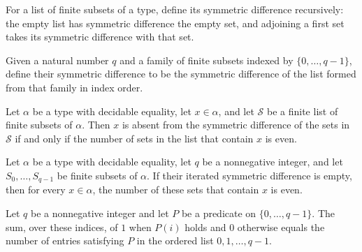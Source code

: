 \begin{definition}
\label{FABL.listSymmDiff}
\leanok
For a list of finite subsets of a type, define its symmetric difference recursively: the
empty list has symmetric difference the empty set, and adjoining a first set takes its
symmetric difference with that set.
\end{definition}

\begin{definition}
\label{FABL.tupleSymmDiff}
\leanok
{}
Given a natural number $q$ and a family of finite subsets indexed by
$\{0,\ldots,q-1\}$, define their symmetric difference to be the symmetric difference
of the list formed from that family in index order.
\end{definition}

\begin{theorem}
\label{FABL.not_mem_listSymmDiff_iff_even_countP}
\leanok
{}
Let $\alpha$ be a type with decidable equality, let $x\in\alpha$, and let $\mathcal S$
be a finite list of finite subsets of $\alpha$. Then $x$ is absent from the symmetric
difference of the sets in $\mathcal S$ if and only if the number of sets in the list
that contain $x$ is even.
\end{theorem}

\begin{theorem}
\label{FABL.even_countP_of_tupleSymmDiff_eq_empty}
\leanok
{}
Let $\alpha$ be a type with decidable equality, let $q$ be a nonnegative integer, and
let $S_0,\ldots,S_{q-1}$ be finite subsets of $\alpha$. If their iterated symmetric
difference is empty, then for every $x\in\alpha$, the number of these sets that contain
$x$ is even.
\end{theorem}

\begin{theorem}
\label{FABL.sum_ite_eq_countP_ofFn}
\leanok
{}
Let $q$ be a nonnegative integer and let $P$ be a predicate on $\{0,\ldots,q-1\}$.
The sum, over these indices, of $1$ when $P(i)$ holds and $0$ otherwise equals the
number of entries satisfying $P$ in the ordered list $0,1,\ldots,q-1$.
\end{theorem}

